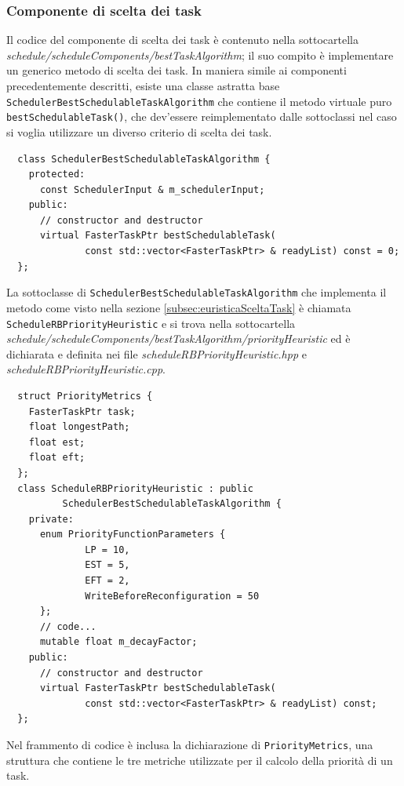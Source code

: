 \subsubsection{Componente di scelta dei task}
Il codice del componente di scelta dei task è contenuto nella sottocartella 
\emph{schedule/scheduleComponents/bestTaskAlgorithm}; il suo compito è 
implementare un generico metodo di scelta dei task. In maniera simile ai 
componenti precedentemente descritti, esiste una classe astratta base 
\verb+SchedulerBestSchedulableTaskAlgorithm+ che contiene il metodo virtuale 
puro \verb+bestSchedulableTask()+, che dev'essere reimplementato dalle 
sottoclassi nel caso si voglia utilizzare un diverso criterio di scelta dei 
task.
\newline
\begin{verbatim}
  class SchedulerBestSchedulableTaskAlgorithm {
    protected:
      const SchedulerInput & m_schedulerInput;
    public:
      // constructor and destructor
      virtual FasterTaskPtr bestSchedulableTask(
              const std::vector<FasterTaskPtr> & readyList) const = 0;
  };
\end{verbatim}

La sottoclasse di \verb+SchedulerBestSchedulableTaskAlgorithm+
che implementa il metodo come visto nella sezione \ref{subsec:euristicaSceltaTask}
è chiamata \verb+ScheduleRBPriorityHeuristic+ e si trova nella sottocartella 
\emph{schedule/scheduleComponents/bestTaskAlgorithm/priorityHeuristic} ed è 
dichiarata e definita nei file \emph{scheduleRBPriorityHeuristic.hpp} e 
\emph{scheduleRBPriorityHeuristic.cpp}.
\newline
\begin{verbatim}
  struct PriorityMetrics {
    FasterTaskPtr task;
    float longestPath;
    float est;
    float eft;
  };
  class ScheduleRBPriorityHeuristic : public 
          SchedulerBestSchedulableTaskAlgorithm {
    private:
      enum PriorityFunctionParameters {
              LP = 10,
              EST = 5,
              EFT = 2,
              WriteBeforeReconfiguration = 50
      };
      // code...
      mutable float m_decayFactor;
    public:
      // constructor and destructor
      virtual FasterTaskPtr bestSchedulableTask(
              const std::vector<FasterTaskPtr> & readyList) const;
  };
\end{verbatim}

Nel frammento di codice è inclusa la dichiarazione di
\verb+PriorityMetrics+, una struttura che contiene le tre metriche utilizzate per 
il calcolo della priorità di un task.

